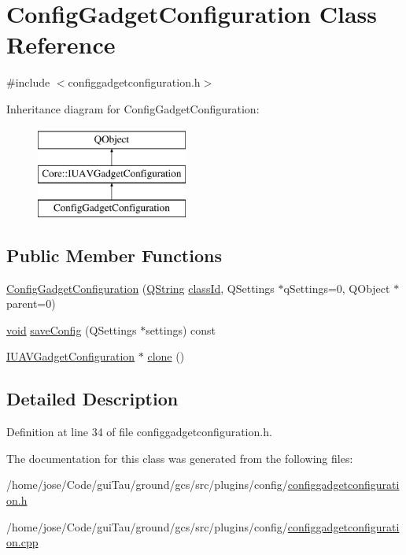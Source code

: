 \hypertarget{class_config_gadget_configuration}{\section{Config\-Gadget\-Configuration Class Reference}
\label{class_config_gadget_configuration}
}


{\ttfamily \#include $<$configgadgetconfiguration.\-h$>$}

Inheritance diagram for Config\-Gadget\-Configuration\-:\begin{figure}[H]
\begin{center}
\leavevmode
\includegraphics[height=3.000000cm]{class_config_gadget_configuration}
\end{center}
\end{figure}
\subsection*{Public Member Functions}
\begin{DoxyCompactItemize}
\item 
\hyperlink{group___config_plugin_ga60e6c6cfd7819f53b6a76447ba34d774}{Config\-Gadget\-Configuration} (\hyperlink{group___u_a_v_objects_plugin_gab9d252f49c333c94a72f97ce3105a32d}{Q\-String} \hyperlink{group___core_plugin_gac953657221ba7fda967ada0408332641}{class\-Id}, Q\-Settings $\ast$q\-Settings=0, Q\-Object $\ast$parent=0)
\item 
\hyperlink{group___u_a_v_objects_plugin_ga444cf2ff3f0ecbe028adce838d373f5c}{void} \hyperlink{group___config_plugin_ga6b1f86f80d200736d29b69452e329040}{save\-Config} (Q\-Settings $\ast$settings) const 
\item 
\hyperlink{group___core_plugin_gacdfdf0b1e39b5002472b76b6564ce51f}{I\-U\-A\-V\-Gadget\-Configuration} $\ast$ \hyperlink{group___config_plugin_gac237bebed60ca183ae60b2b4598acc47}{clone} ()
\end{DoxyCompactItemize}


\subsection{Detailed Description}


Definition at line 34 of file configgadgetconfiguration.\-h.



The documentation for this class was generated from the following files\-:\begin{DoxyCompactItemize}
\item 
/home/jose/\-Code/gui\-Tau/ground/gcs/src/plugins/config/\hyperlink{configgadgetconfiguration_8h}{configgadgetconfiguration.\-h}\item 
/home/jose/\-Code/gui\-Tau/ground/gcs/src/plugins/config/\hyperlink{configgadgetconfiguration_8cpp}{configgadgetconfiguration.\-cpp}\end{DoxyCompactItemize}
